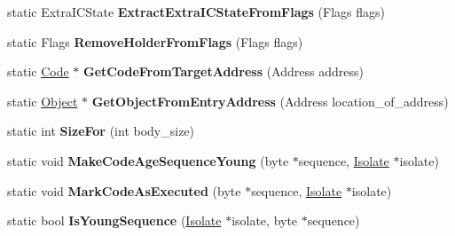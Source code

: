 \begin{DoxyCompactItemize}
\item 
static Extra\+I\+C\+State {\bfseries Extract\+Extra\+I\+C\+State\+From\+Flags} (Flags flags)\hypertarget{classv8_1_1internal_1_1_code_aee2182492672bc97ccb8b64061ca346f}{}\label{classv8_1_1internal_1_1_code_aee2182492672bc97ccb8b64061ca346f}

\item 
static Flags {\bfseries Remove\+Holder\+From\+Flags} (Flags flags)\hypertarget{classv8_1_1internal_1_1_code_a1bbcf8b5049ab1557f88bf8750fca961}{}\label{classv8_1_1internal_1_1_code_a1bbcf8b5049ab1557f88bf8750fca961}

\item 
static \hyperlink{classv8_1_1internal_1_1_code}{Code} $\ast$ {\bfseries Get\+Code\+From\+Target\+Address} (Address address)\hypertarget{classv8_1_1internal_1_1_code_a2f9d00c94ce780d060b933318a78e118}{}\label{classv8_1_1internal_1_1_code_a2f9d00c94ce780d060b933318a78e118}

\item 
static \hyperlink{classv8_1_1internal_1_1_object}{Object} $\ast$ {\bfseries Get\+Object\+From\+Entry\+Address} (Address location\+\_\+of\+\_\+address)\hypertarget{classv8_1_1internal_1_1_code_ab848ed45a70efa2b3c2e3a30050f22d9}{}\label{classv8_1_1internal_1_1_code_ab848ed45a70efa2b3c2e3a30050f22d9}

\item 
static int {\bfseries Size\+For} (int body\+\_\+size)\hypertarget{classv8_1_1internal_1_1_code_acad887ee43af2a9777cd0569940d54e1}{}\label{classv8_1_1internal_1_1_code_acad887ee43af2a9777cd0569940d54e1}

\item 
static void {\bfseries Make\+Code\+Age\+Sequence\+Young} (byte $\ast$sequence, \hyperlink{classv8_1_1internal_1_1_isolate}{Isolate} $\ast$isolate)\hypertarget{classv8_1_1internal_1_1_code_a819cb6b55450a6d6f995736672ced5ed}{}\label{classv8_1_1internal_1_1_code_a819cb6b55450a6d6f995736672ced5ed}

\item 
static void {\bfseries Mark\+Code\+As\+Executed} (byte $\ast$sequence, \hyperlink{classv8_1_1internal_1_1_isolate}{Isolate} $\ast$isolate)\hypertarget{classv8_1_1internal_1_1_code_a53811e4aff8fc8ebc6f9953d0781e449}{}\label{classv8_1_1internal_1_1_code_a53811e4aff8fc8ebc6f9953d0781e449}

\item 
static bool {\bfseries Is\+Young\+Sequence} (\hyperlink{classv8_1_1internal_1_1_isolate}{Isolate} $\ast$isolate, byte $\ast$sequence)\hypertarget{classv8_1_1internal_1_1_code_a4b5476efb1b3a65708c8ee1958e80b3a}{}\label{classv8_1_1internal_1_1_code_a4b5476efb1b3a65708c8ee1958e80b3a}


\end{DoxyCompactItemize}
